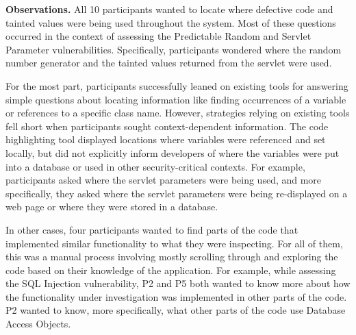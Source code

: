 \documentclass[conference]{IEEEtran}
\begin{document}
\noindent\textbf{Observations.}
All 10 participants wanted to locate where defective code and tainted values were being used throughout the system. 
Most of these questions occurred in the context of assessing the Predictable Random and Servlet Parameter vulnerabilities.
Specifically, participants wondered where the random number generator and the tainted values returned from the servlet were used.

For the most part, participants successfully leaned on existing tools for answering simple questions about locating information like finding occurrences of a variable or references to a specific class name. 
However, strategies relying on existing tools fell short when participants sought context-dependent information. 
The code highlighting tool displayed locations where variables were referenced and set locally, but did not explicitly inform developers of where the variables were put into a database or used in other security-critical contexts.
For example, participants asked where the servlet parameters were being used, and more specifically, they asked where the servlet parameters were being re-displayed on a web page or where they were stored in a database.

In other cases, four participants wanted to find parts of the code that implemented similar functionality to what they were inspecting.
For all of them, this was a manual process involving mostly scrolling through and exploring the code based on their knowledge of the application.
For example, while assessing the SQL Injection vulnerability, P2 and P5 both wanted to know more about how the functionality under investigation was implemented in other parts of the code. 
P2 wanted to know, more specifically, what other parts of the code use Database Access Objects.
\\

\end{document}
